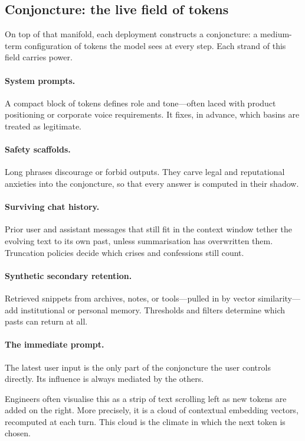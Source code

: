 \documentclass[12pt,a4paper]{article}
\begin{document}
\subsection{Conjoncture: the live field of tokens}

On top of that manifold, each deployment constructs a conjoncture: a medium-term configuration of tokens the model sees at every step. Each strand of this field carries power.

\paragraph{System prompts.} A compact block of tokens defines role and tone---often laced with product positioning or corporate voice requirements. It fixes, in advance, which basins are treated as legitimate.

\paragraph{Safety scaffolds.} Long phrases discourage or forbid outputs. They carve legal and reputational anxieties into the conjoncture, so that every answer is computed in their shadow.

\paragraph{Surviving chat history.} Prior user and assistant messages that still fit in the context window tether the evolving text to its own past, unless summarisation has overwritten them. Truncation policies decide which crises and confessions still count.

\paragraph{Synthetic secondary retention.} Retrieved snippets from archives, notes, or tools---pulled in by vector similarity---add institutional or personal memory. Thresholds and filters determine which pasts can return at all.

\paragraph{The immediate prompt.} The latest user input is the only part of the conjoncture the user controls directly. Its influence is always mediated by the others.

Engineers often visualise this as a strip of text scrolling left as new tokens are added on the right. More precisely, it is a cloud of contextual embedding vectors, recomputed at each turn. This cloud is the climate in which the next token is chosen.
\end{document}
